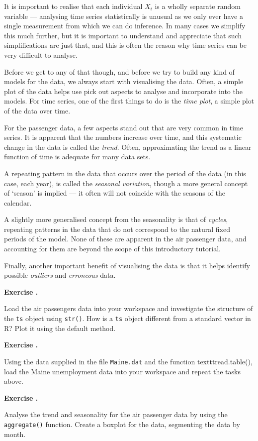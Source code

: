 \documentclass[10pt, a4paper]{article}
\newcounter{wssection}
\newcounter{wsexercise}[wssection]
\newcommand{\worksheetexercise}{
\stepcounter{wsexercise}
\vspace{5mm} \noindent \textbf{Exercise \thewssection.\thewsexercise \;}
}
\begin{document}
It is important to realise that each individual $X_i$ is a wholly
separate random variable --- analysing time series statistically is
unusual as we only ever have a single measurement from which we can
do inference. In many cases we simplify this much further, but it is
important to understand and appreciate that such simplifications are
just that, and this is often the reason why time series can be very
difficult to analyse.

Before we get to any of that though, and before we try to build any
kind of models for the data, we always start with visualising the
data. Often, a simple plot of the data helps use pick out aspects to
analyse and incorporate into the models. For time series, one of the
first things to do is the \emph{time plot}, a simple plot of the data
over time.

For the passenger data, a few aspects stand out that are very common
in time series. It is apparent that the numbers increase over time,
and this systematic change in the data is called the
\emph{trend}. Often, approximating the trend as a linear function of
time is adequate for many data sets.

A repeating pattern in the data that occurs over the period of the
data (in this case, each year), is called the
\emph{seasonal variation}, though a more general concept of `season'
is implied --- it often will not coincide with the seasons of the
calendar.

A slightly more generalised concept from the seasonality is that of
\emph{cycles}, repeating patterns in the data that do not correspond
to the natural fixed periods of the model. None of these are apparent
in the air passenger data, and accounting for them are beyond the
scope of this introductory tutorial.

Finally, another important benefit of visualising the data is that it
helps identify possible \emph{outliers} and \emph{erroneous} data.


\worksheetexercise
Load the air passengers data into your workspace and investigate the
structure of the \texttt{ts} object using \texttt{str()}. How is a
\texttt{ts} object different from a standard vector in R? Plot it
using the default  method.

\worksheetexercise
Using the data supplied in the file \texttt{Maine.dat} and the
function texttt{read.table()}, load the Maine unemployment data into
your workspace and repeat the tasks above.

\worksheetexercise
Analyse the trend and seasonality for the air passenger data by using
the \texttt{aggregate()} function. Create a boxplot for the data,
segmenting the data by month.
\end{document}
